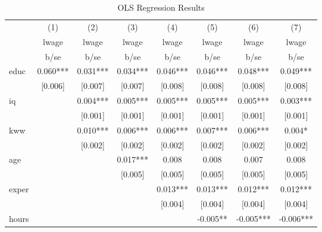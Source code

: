 \begin{table}[htbp]\centering
\def\sym#1{\ifmmode^{#1}\else\(^{#1}\)\fi}
\caption{OLS Regression Results}
\begin{tabular}{l*{7}{c}}
\hline\hline
            &\multicolumn{1}{c}{(1)}&\multicolumn{1}{c}{(2)}&\multicolumn{1}{c}{(3)}&\multicolumn{1}{c}{(4)}&\multicolumn{1}{c}{(5)}&\multicolumn{1}{c}{(6)}&\multicolumn{1}{c}{(7)}\\
            &\multicolumn{1}{c}{lwage}&\multicolumn{1}{c}{lwage}&\multicolumn{1}{c}{lwage}&\multicolumn{1}{c}{lwage}&\multicolumn{1}{c}{lwage}&\multicolumn{1}{c}{lwage}&\multicolumn{1}{c}{lwage}\\
            &        b/se   &        b/se   &        b/se   &        b/se   &        b/se   &        b/se   &        b/se   \\
\hline
educ        &       0.060***&       0.031***&       0.034***&       0.046***&       0.046***&       0.048***&       0.049***\\
            &     [0.006]   &     [0.007]   &     [0.007]   &     [0.008]   &     [0.008]   &     [0.008]   &     [0.008]   \\
iq          &               &       0.004***&       0.005***&       0.005***&       0.005***&       0.005***&       0.003***\\
            &               &     [0.001]   &     [0.001]   &     [0.001]   &     [0.001]   &     [0.001]   &     [0.001]   \\
kww         &               &       0.010***&       0.006***&       0.006***&       0.007***&       0.006***&       0.004*  \\
            &               &     [0.002]   &     [0.002]   &     [0.002]   &     [0.002]   &     [0.002]   &     [0.002]   \\
age         &               &               &       0.017***&       0.008   &       0.008   &       0.007   &       0.008   \\
            &               &               &     [0.005]   &     [0.005]   &     [0.005]   &     [0.005]   &     [0.005]   \\
exper       &               &               &               &       0.013***&       0.013***&       0.012***&       0.012***\\
            &               &               &               &     [0.004]   &     [0.004]   &     [0.004]   &     [0.004]   \\
hours       &               &               &               &               &      -0.005** &      -0.005***&      -0.006***\\

\end{tabular}
\end{table}
